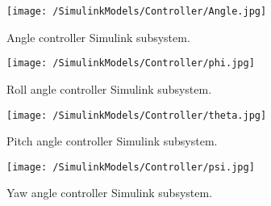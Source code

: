 \begin{figure}[htb]
\begin{center}
	\texttt{[image: /SimulinkModels/Controller/Angle.jpg]}%
	\end{center}
	\caption{Angle controller Simulink subsystem.}%
\end{figure}

\begin{figure}[htb]
\begin{center}
	\texttt{[image: /SimulinkModels/Controller/phi.jpg]}%
	\end{center}
	\caption{Roll angle controller Simulink subsystem.}%
\end{figure}

\begin{figure}[htb]
\begin{center}
	\texttt{[image: /SimulinkModels/Controller/theta.jpg]}%
	\end{center}
	\caption{Pitch angle controller Simulink subsystem.}%
\end{figure}

\begin{figure}[htb]
\begin{center}
	\texttt{[image: /SimulinkModels/Controller/psi.jpg]}%
	\end{center}
	\caption{Yaw angle controller Simulink subsystem.}%
\end{figure}

\clearpage